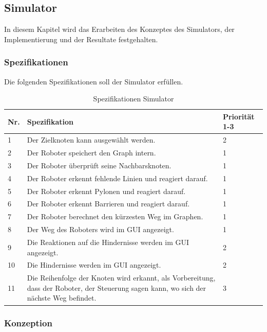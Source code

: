 \subsection{Simulator}

In diesem Kapitel wird das Erarbeiten des Konzeptes des Simulators, der Implementierung und der Resultate festgehalten.


\subsubsection{Spezifikationen}

Die folgenden Spezifikationen soll der Simulator erfüllen.

\begin{table}[H]
\centering
\small
\begin{tabularx}{\textwidth}{|l|X|l|}
\hline
  \textbf{Nr.} & \textbf{Spezifikation} & \textbf{Priorität 1-3}  \\
  \hline
  1  & Der Zielknoten kann ausgewählt werden. &  2\\
  \hline
   2   & Der Roboter speichert den Graph intern.  & 1\\
  \hline
   3 & Der Roboter überprüft seine Nachbarsknoten.&1\\
  \hline
  4 & Der Roboter erkennt fehlende Linien und reagiert darauf. & 1\\
  \hline
  5 &   Der Roboter erkennt Pylonen und reagiert darauf. & 1\\
  \hline
   6  &   Der Roboter erkennt Barrieren und reagiert darauf. & 1\\
  \hline
    7 &   Der Roboter berechnet den kürzesten Weg im Graphen.& 1\\
  \hline
     8  &   Der Weg des Roboters wird im GUI angezeigt. & 1\\
  \hline
      9   &   Die Reaktionen auf die Hindernisse werden im GUI angezeigt. & 2\\
  \hline
 10   &   Die Hindernisse werden im GUI angezeigt. & 2\\
  \hline
   11   &   Die Reihenfolge der Knoten wird erkannt, als Vorbereitung, dass der Roboter, der Steuerung sagen kann, wo sich der nächste Weg befindet. & 3\\
  \hline

\end{tabularx}
\caption{Spezifikationen Simulator}
\label{table:spezifikation-simulator}
\end{table}

\subsubsection{Konzeption}

